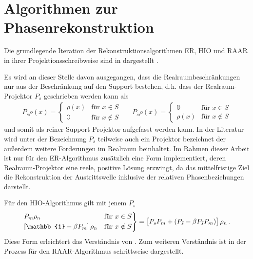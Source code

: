 \chapter{Algorithmen zur Phasenrekonstruktion}
\label{app:algos}
Die grundlegende Iteration der Rekonstruktionsalgorithmen ER, HIO und RAAR in ihrer Projektionsschreibweise sind in  dargestellt \cite{fienup1978,luke2004,marchesini2007}.

Es wird an dieser Stelle davon ausgegangen, dass die Realraumbeschränkungen nur aus der Beschränkung auf den Support bestehen, d.h. dass der Realraum-Projektor $P_s$ geschrieben werden kann als 
\begin{align*}
	P_s\rho (x)=\begin{cases}
	\rho (x)  &\text{für } x\in S\\
	\mathbb{0}  &\text{für }x\notin S
	\end{cases} &   &   
	P_{\bar{s}}\rho (x)=\begin{cases}
	\mathbb{0} &\text{für } x\in S\\
	\rho (x)   &\text{für }x\notin S
	\end{cases}
\end{align*}
und somit als reiner Support-Projektor aufgefasst werden kann. In der Literatur wird unter der Bezeichnung $P_s$ teilweise auch ein Projektor bezeichnet der außerdem weitere Forderungen im Realraum beinhaltet. Im Rahmen dieser Arbeit ist nur für den ER-Algorithmus zusätzlich eine Form implementiert, deren Realraum-Projektor eine reele, positive Lösung erzwingt, da das mittelfristige Ziel die Rekonstruktion der Austrittswelle inklusive der relativen Phasenbeziehungen darstellt.
 
Für den HIO-Algorithmus gilt mit jenem $P_s$ 
\begin{align*}
	\begin{rcases}	
	P_m\rho_n                               & \text{für } x\in S    \\
	\left[\mathbb{1}-\beta P_m\right]\rho_n & \text{für } x\notin S 
	\end{rcases}	
	=\left[P_sP_m+\left(P_{\bar{s}}-\beta P_{\bar{s}} P_m\right)\right]\rho_n
	\,.
\end{align*}
Diese Form erleichtert das Verständnis von . Zum weiteren Verständnis ist in  der Prozess für den RAAR-Algorithmus schrittweise dargestellt.
	
